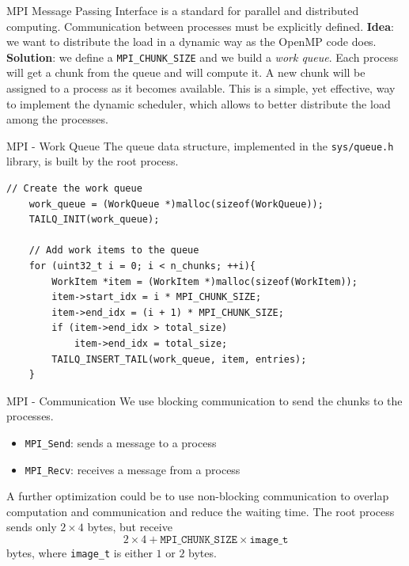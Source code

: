 %
%
\begin{frame}[fragile,t]{MPI}
    Message Passing Interface is a standard for parallel and distributed
    computing. Communication between processes must be explicitly defined.
    \textbf{Idea}: we want to distribute the load in a dynamic way as
    the OpenMP code does. \\
    \textbf{Solution}: we define a \texttt{MPI\_CHUNK\_SIZE} and we build
    a \textit{work queue}. Each process will get a chunk from the queue
    and will compute it. A new chunk will be assigned to a process
    as it becomes available.
    \newline
    This is a simple, yet effective, way to implement the dynamic scheduler,
    which allows to better distribute the load among the processes.
\end{frame}
\begin{frame}[fragile,t]{MPI - Work Queue}
    The queue data structure, implemented in the \texttt{sys/queue.h} library,
    is built by the root process.
    \begin{lstlisting}[style=customc, basicstyle=\fontsize{7}{7}\selectfont\ttfamily]
    // Create the work queue
    work_queue = (WorkQueue *)malloc(sizeof(WorkQueue));
    TAILQ_INIT(work_queue);

    // Add work items to the queue
    for (uint32_t i = 0; i < n_chunks; ++i){
        WorkItem *item = (WorkItem *)malloc(sizeof(WorkItem));
        item->start_idx = i * MPI_CHUNK_SIZE;
        item->end_idx = (i + 1) * MPI_CHUNK_SIZE;
        if (item->end_idx > total_size)
            item->end_idx = total_size;
        TAILQ_INSERT_TAIL(work_queue, item, entries);
    }
    \end{lstlisting}
\end{frame}
\begin{frame}[fragile,t]{MPI - Communication}
    We use blocking communication to send the chunks to the processes.
    \begin{itemize}
        \item \texttt{MPI\_Send}: sends a message to a process
        \item \texttt{MPI\_Recv}: receives a message from a process
    \end{itemize}
    A further optimization could be to use non-blocking communication
    to overlap computation and communication and reduce the waiting time.
    The root process sends only $2\times4$ bytes, but receive 
    $$2\times4+\texttt{MPI\_CHUNK\_SIZE}\times\texttt{image\_t}$$
    bytes, where \texttt{image\_t} is either $1$ or $2$ bytes.
\end{frame}
